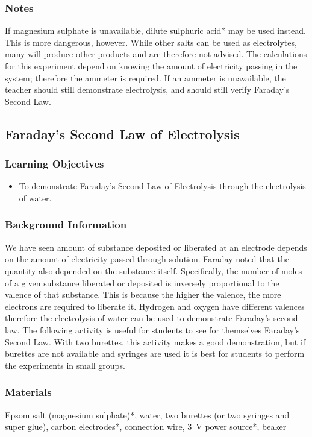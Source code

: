 \subsubsection*{Notes}
If magnesium sulphate is unavailable, dilute sulphuric acid* may be used instead. This is more dangerous, however. While other salts can be used as electrolytes, many will produce other products and are therefore not advised. The calculations for this experiment depend on knowing the amount of electricity passing in the system; therefore the ammeter is required. If an ammeter is unavailable, the teacher should still demonstrate electrolysis, and should still verify Faraday's Second Law.

\subsection{Faraday's Second Law of Electrolysis}

\subsubsection*{Learning Objectives}
\begin{itemize}
\item{To demonstrate Faraday's Second Law of Electrolysis through the electrolysis of water.}
\end{itemize}

\subsubsection*{Background Information}
We have seen amount of substance deposited or liberated at an electrode depends on the amount of electricity passed through solution. Faraday noted that the quantity also depended on the substance itself. Specifically, the number of moles of a given substance liberated or deposited is inversely proportional to the valence of that substance. This is because the higher the valence, the more electrons are required to liberate it. Hydrogen and oxygen have different valences therefore the electrolysis of water can be used to demonstrate Faraday's second law. 
The following activity is useful for students to see for themselves Faraday's Second Law. With two burettes, this activity makes a good demonstration, but if burettes are not available and syringes are used it is best for students to perform the experiments in small groups.

\subsubsection*{Materials}
Epsom salt (magnesium sulphate)*, water, two burettes (or two syringes and super glue), carbon electrodes*, connection wire, 3~V power source*, beaker

